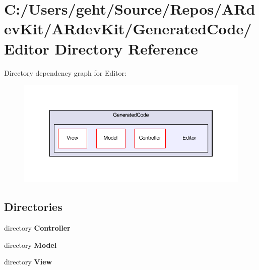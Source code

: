 \section{C\-:/\-Users/geht/\-Source/\-Repos/\-A\-Rdev\-Kit/\-A\-Rdev\-Kit/\-Generated\-Code/\-Editor Directory Reference}
\label{dir_765f2e99c75dd86af763d525919376ee}
Directory dependency graph for Editor\-:
\nopagebreak
\begin{figure}[H]
\begin{center}
\leavevmode
\includegraphics[width=350pt]{dir_765f2e99c75dd86af763d525919376ee_dep}
\end{center}
\end{figure}
\subsection*{Directories}
\begin{DoxyCompactItemize}
\item 
directory {\bf Controller}
\item 
directory {\bf Model}
\item 
directory {\bf View}
\end{DoxyCompactItemize}
